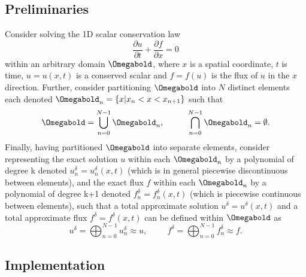 \subsection{Preliminaries}\label{fr_intro_pre}

Consider solving the 1D scalar conservation law
\begin{equation}
\frac{\partial u}{\partial t}+\frac{\partial f}{\partial x}=0
\label{governing}
\end{equation}
within an arbitrary domain $\Omegabold$, where $x$ is a spatial coordinate, $t$ is time, $u=u(x,t)$ is a conserved scalar and $f=f(u)$ is the flux of $u$ in the $x$ direction. Further, consider partitioning $\Omegabold$ into $N$ distinct elements each denoted $\Omegabold_n=\{x|x_n<x<x_{n+1}\}$ such that
\begin{equation}
\Omegabold=\bigcup_{n=0}^{N-1}\Omegabold_n,\hspace{1cm}\bigcap_{n=0}^{N-1}\Omegabold_n=\emptyset.
\end{equation}
Finally, having partitioned $\Omegabold$ into separate elements, consider representing the exact solution $u$ within each $\Omegabold_n$ by a polynomial of degree k denoted $u^{\delta}_n=u^{\delta}_n(x,t)$ (which is in general piecewise discontinuous between elements), and the exact flux $f$ within each $\Omegabold_n$ by a polynomial of degree k+1 denoted $f^{\delta}_n=f^{\delta}_n(x,t)$ (which is piecewise continuous between elements), such that a total approximate solution $u^{\delta}=u^{\delta}(x,t)$ and a total approximate flux $f^{\delta}=f^{\delta}(x,t)$ can be defined within $\Omegabold$ as
\begin{equation}
u^{\delta}=\bigoplus_{n=0}^{N-1}u_n^{\delta}\approx u,\hspace{1cm}f^{\delta}=\bigoplus_{n=0}^{N-1}f_n^{\delta}\approx f.
\end{equation}

\subsection{Implementation}


